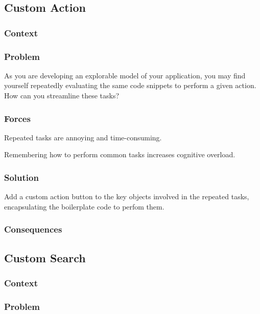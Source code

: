 \documentclass[sigconf]{acmart}
\begin{document}
\subsection*{Custom Action}\label{pat:customAction}
\subsubsection*{Context}
\subsubsection*{Problem}

As you are developing an explorable model of your application, you may find yourself repeatedly evaluating the same code snippets to perform a given action. How can you streamline these tasks?

\subsubsection*{Forces}

Repeated tasks are annoying and time-consuming.

Remembering how to perform common tasks increases cognitive overload.

\subsubsection*{Solution}

Add a custom action button to the key objects involved in the repeated tasks, encapsulating the boilerplate code to perfom them.


\subsubsection*{Consequences}

\subsection*{Custom Search}\label{pat:customSearch}
\subsubsection*{Context}
\subsubsection*{Problem}
\end{document}
